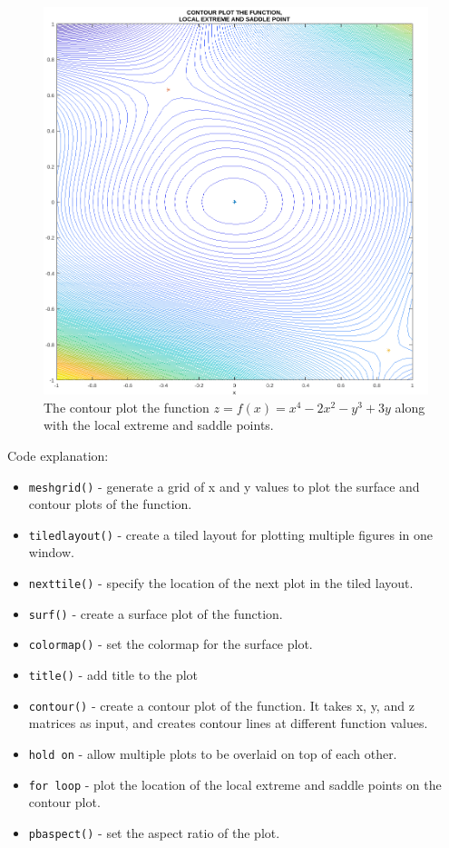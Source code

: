 \begin{figure}[H]
  \centering
  \includegraphics[width=12cm]{graphics/1b.png}
  \caption{The contour plot the function $ z = f(x) = x^4 - 2x^2 - y^3 + 3y $ along with the local extreme and saddle points.}
\end{figure}

Code explanation: 
\begin{itemize}
  \item \texttt{\color{mygreen}meshgrid()} - generate a grid of x and y values to plot the surface and contour plots of the function.
  \item \texttt{\color{mygreen}tiledlayout()} - create a tiled layout for plotting multiple figures in one window.
  \item \texttt{\color{mygreen}nexttile()} - specify the location of the next plot in the tiled layout. 
  \item \texttt{\color{mygreen}surf()} - create a surface plot of the function.
  \item \texttt{\color{mygreen}colormap()} - set the colormap for the surface plot.
  \item \texttt{\color{mygreen}title()} - add title to the plot
  \item \texttt{\color{mygreen}contour()} - create a contour plot of the function. It takes x, y, and z matrices as input, and creates contour lines at different function values.
  \item \texttt{\color{mygreen}hold on} - allow multiple plots to be overlaid on top of each other.
  \item \texttt{\color{mygreen}for loop} - plot the location of the local extreme and saddle points on the contour plot.
  \item \texttt{\color{mygreen}pbaspect()} - set the aspect ratio of the plot.
\end{itemize}

\vspace*{2cm}